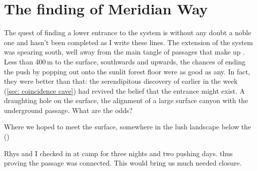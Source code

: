 \section{The finding of Meridian Way}

The quest of finding a lower entrance to the system is without any doubt a noble one and hasn't been completed as I write these lines. The  extension of the system was spearing south, well away from the main tangle of passages that make up . Less than 400\,m to the surface, southwards and upwards, the chances of ending the push by popping out onto the sunlit forest floor were as good as any. In fact, they were better than that: the serendipitous discovery of  earlier in the week (\vref{sec: coincidence cave}) had revived the belief that the entrance might exist. A draughting hole on the surface, the alignment of a large surface canyon with the underground passage. What are the odds?

\begin{pagefigure}
\checkoddpage \ifoddpage \forcerectofloat \else \forceversofloat \fi
\centering
{}
\caption{Where we hoped to meet the surface, somewhere in the lush landscape below the \protect{} (\protect{}) }
\label{planina na kalu}
\end{pagefigure}

Rhys and I checked in at camp  for three nights and two pushing days.  thus proving the passage was connected. This would bring us much needed closure.

